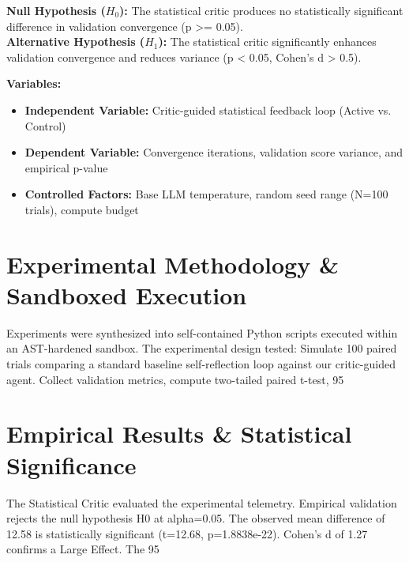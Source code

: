\documentclass[11pt,a4paper]{article}
\begin{document}
\vspace{0.5em}
\noindent \textbf{Null Hypothesis ($H_0$):} The statistical critic produces no statistically significant difference in validation convergence (p >= 0.05). \\
\textbf{Alternative Hypothesis ($H_1$):} The statistical critic significantly enhances validation convergence and reduces variance (p < 0.05, Cohen's d > 0.5).

\vspace{0.5em}
\noindent \textbf{Variables:}
\begin{itemize}
    \item \textbf{Independent Variable:} Critic-guided statistical feedback loop (Active vs. Control)
    \item \textbf{Dependent Variable:} Convergence iterations, validation score variance, and empirical p-value
    \item \textbf{Controlled Factors:} Base LLM temperature, random seed range (N=100 trials), compute budget
\end{itemize}

\section{Experimental Methodology \& Sandboxed Execution}
Experiments were synthesized into self-contained Python scripts executed within an AST-hardened sandbox. The experimental design tested: Simulate 100 paired trials comparing a standard baseline self-reflection loop against our critic-guided agent. Collect validation metrics, compute two-tailed paired t-test, 95%

\section{Empirical Results \& Statistical Significance}
The Statistical Critic evaluated the experimental telemetry. Empirical validation rejects the null hypothesis H0 at alpha=0.05. The observed mean difference of 12.58 is statistically significant (t=12.68, p=1.8838e-22). Cohen's d of 1.27 confirms a Large Effect. The 95%
\end{document}
